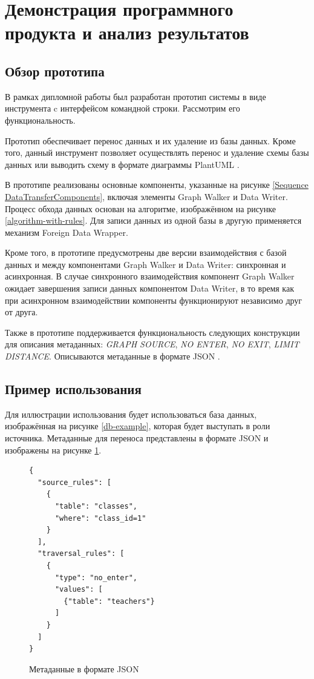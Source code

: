 \section{Демонстрация программного продукта и анализ результатов}

\subsection{Обзор прототипа}
В рамках дипломной работы был разработан прототип системы в виде инструмента c интерфейсом командной строки. Рассмотрим его функциональность.

Прототип обеспечивает перенос данных и их удаление из базы данных. Кроме того, данный инструмент позволяет осуществлять перенос и удаление схемы базы данных или выводить схему в формате диаграммы PlantUML \cite{plantuml}.

В прототипе реализованы основные компоненты, указанные на рисунке \ref{Sequence DataTransferComponents}, включая элементы Graph Walker и Data Writer. Процесс обхода данных основан на алгоритме, изображённом на рисунке \ref{algorithm-with-rules}. Для записи данных из одной базы в другую применяется механизм Foreign Data Wrapper.

Кроме того, в прототипе предусмотрены две версии взаимодействия с базой данных и между компонентами Graph Walker и Data Writer: синхронная и асинхронная. В случае синхронного взаимодействия компонент Graph Walker ожидает завершения записи данных компонентом Data Writer, в то время как при асинхронном взаимодействии компоненты функционируют независимо друг от друга.

Также в прототипе поддерживается функциональность следующих конструкции для описания метаданных: \textit{GRAPH SOURCE}, \textit{NO ENTER}, \textit{NO EXIT}, \textit{LIMIT DISTANCE}. Описываются метаданные в формате JSON \cite{json}.

\subsection{Пример использования}

Для иллюстрации использования будет использоваться база данных, изображённая на рисунке \ref{db-example}, которая будет выступать в роли источника. Метаданные для переноса представлены в формате JSON и изображены на рисунке \ref{metadata-example-4-json}.

\begin{figure}
  \begin{lstlisting}
{
  "source_rules": [
    {
      "table": "classes",
      "where": "class_id=1"
    }
  ],
  "traversal_rules": [
    {
      "type": "no_enter",
      "values": [
        {"table": "teachers"}
      ]
    }
  ]
}
  \end{lstlisting}
  \caption{Метаданные в формате JSON}
  \label{metadata-example-4-json}
\end{figure}

